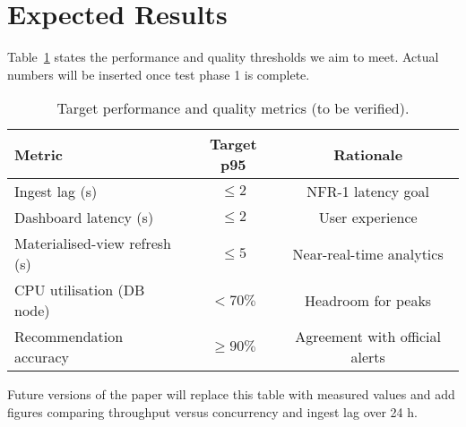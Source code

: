 \section{Expected Results}\label{sec:results}
Table~\ref{tab:targets} states the performance and quality thresholds we aim to meet.  
Actual numbers will be inserted once test phase 1 is complete.

\begin{table}[tb]
\centering
\caption{Target performance and quality metrics (to be verified).}
\label{tab:targets}
\begin{tabular}{lcc}
\toprule
\textbf{Metric} & \textbf{Target p95} & \textbf{Rationale}\\
\midrule
Ingest lag (s)                & $\le2$          & NFR-1 latency goal\\
Dashboard latency (s)         & $\le2$          & User experience\\
Materialised-view refresh (s) & $\le5$          & Near-real-time analytics\\
CPU utilisation (DB node)     & $<70\%$         & Headroom for peaks\\
Recommendation accuracy       & $\ge90\%$       & Agreement with official alerts\\
\bottomrule
\end{tabular}
\end{table}

Future versions of the paper will replace this table with measured values and add figures comparing throughput versus concurrency and ingest lag over 24 h.

